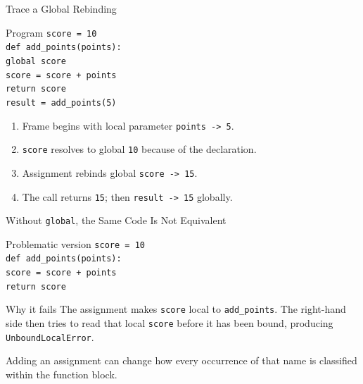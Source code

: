 \documentclass[aspectratio=169,10pt]{beamer}
\begin{document}
\begin{frame}{Trace a Global Rebinding}
  \begin{block}{Program}
    \texttt{score = 10}\\[0.06in]
    \texttt{def add\_points(points):}\\
    \hspace*{0.20in}\texttt{global score}\\
    \hspace*{0.20in}\texttt{score = score + points}\\
    \hspace*{0.20in}\texttt{return score}\\[0.08in]
    \texttt{result = add\_points(5)}
  \end{block}

  \begin{enumerate}
    \item Frame begins with local parameter \texttt{points -> 5}.
    \item \texttt{score} resolves to global \texttt{10} because of the declaration.
    \item Assignment rebinds global \texttt{score -> 15}.
    \item The call returns \texttt{15}; then \texttt{result -> 15} globally.
  \end{enumerate}
\end{frame}

\begin{frame}{Without \texttt{global}, the Same Code Is Not Equivalent}
  \begin{block}{Problematic version}
    \texttt{score = 10}\\[0.06in]
    \texttt{def add\_points(points):}\\
    \hspace*{0.20in}\texttt{score = score + points}\\
    \hspace*{0.20in}\texttt{return score}
  \end{block}

  \begin{alertblock}{Why it fails}
    The assignment makes \texttt{score} local to \texttt{add\_points}. The right-hand side then tries to read that local \texttt{score} before it has been bound, producing \texttt{UnboundLocalError}.
  \end{alertblock}

  \begin{keyidea}
    Adding an assignment can change how every occurrence of that name is classified within the function block.
  \end{keyidea}
\end{frame}
\end{document}
